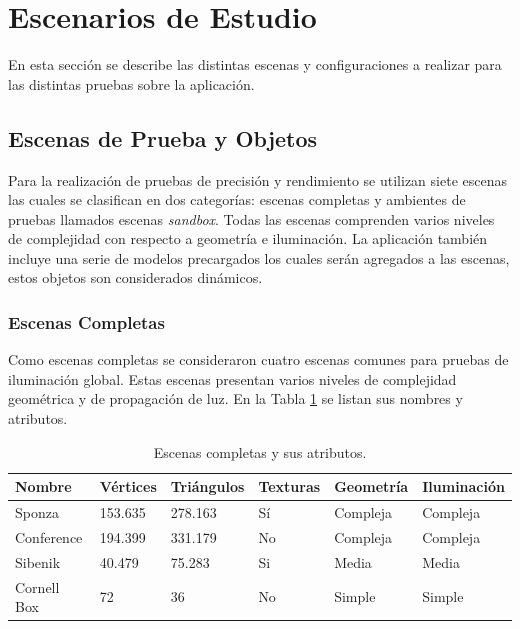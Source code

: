 \section{Escenarios de Estudio}

En esta sección se describe las distintas escenas y configuraciones a realizar para las distintas pruebas sobre la aplicación.

\subsection{Escenas de Prueba y Objetos}

Para la realización de pruebas de precisión y rendimiento se utilizan siete escenas las cuales se clasifican en dos categorías: escenas completas y ambientes de pruebas llamados escenas \emph{sandbox}. Todas las escenas comprenden varios niveles de complejidad con respecto a geometría e iluminación. La aplicación también incluye una serie de modelos precargados los cuales serán agregados a las escenas, estos objetos son considerados dinámicos.

\subsubsection{Escenas Completas}

Como escenas completas se consideraron cuatro escenas comunes para pruebas de iluminación global. Estas escenas presentan varios niveles de complejidad geométrica y de propagación de luz. En la Tabla \ref{tab:scenes_attributes} se listan sus nombres y atributos.

\begin{table}[h]
\centering
\begin{tabular}{|l|l|l|l|l|l|}
\hline
Nombre            & Vértices & Triángulos & Texturas & Geometría & Iluminación \\ \hline
Sponza     & 153.635  & 278.163    & Sí       & Compleja  & Compleja     \\ \hline
Conference   & 194.399  & 331.179    & No       & Compleja  & Compleja     \\ \hline
Sibenik & 40.479   & 75.283     & Si       & Media     & Media        \\ \hline
Cornell Box       & 72       & 36         & No       & Simple    & Simple       \\ \hline
\end{tabular}
\caption{Escenas completas y sus atributos.}
\label{tab:scenes_attributes}
\end{table}

